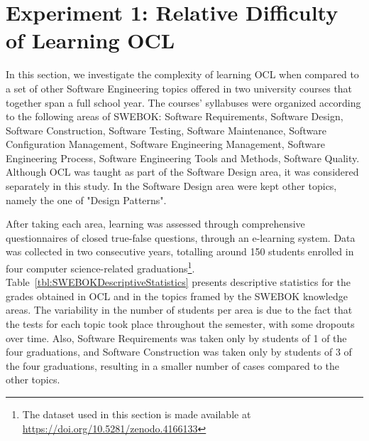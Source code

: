 \section{Experiment 1: Relative Difficulty of Learning OCL}
\label{Results-1}

In this section, we investigate the complexity of learning OCL when compared to a set of other Software Engineering topics offered in two university courses that together span a full school year. The courses' syllabuses were organized according to the following areas of SWEBOK: Software Requirements, Software Design, Software Construction, Software Testing, Software Maintenance, Software Configuration Management, Software Engineering Management, Software Engineering Process, Software Engineering Tools and Methods, Software Quality. Although OCL was taught as part of the Software Design area, it was considered separately in this study. In the Software Design area were kept other topics, namely the one of "Design Patterns".

After taking each area, learning was assessed through comprehensive questionnaires of closed true-false questions, through an e-learning system. Data was collected in two consecutive years, totalling around 150 students enrolled in four computer science-related graduations\footnote{The dataset used in this section is made available at \url{https://doi.org/10.5281/zenodo.4166133}}. Table~\ref{tbl:SWEBOKDescriptiveStatistics} presents descriptive statistics for the grades obtained in OCL and in the topics framed by the SWEBOK knowledge areas. The variability in the number of students per area is due to the fact that the tests for each topic took place throughout the semester, with some dropouts over time. Also, Software Requirements was taken only by students of 1 of the four graduations, and Software Construction was taken only by students of 3 of the four graduations, resulting in a smaller number of cases compared to the other topics.

